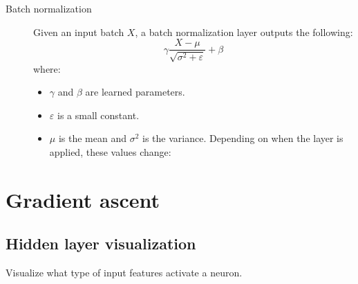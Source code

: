 \begin{description}
    \item[Batch normalization] 
        Given an input batch $X$, a batch normalization layer outputs the following:
        \[ \gamma \frac{X - \mu}{\sqrt{\sigma^2 + \varepsilon}} + \beta \]
        where:
        \begin{itemize}
            \item $\gamma$ and $\beta$ are learned parameters.
            \item $\varepsilon$ is a small constant.
            \item $\mu$ is the mean and $\sigma^2$ is the variance.
                Depending on when the layer is applied, these values change:
        \end{itemize}
\end{description}



\section{Gradient ascent}


\subsection{Hidden layer visualization}

Visualize what type of input features activate a neuron.

